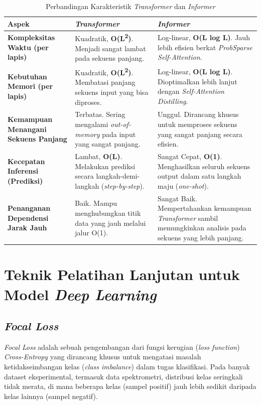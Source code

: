 \begin{table}[H]
\centering
\caption{Perbandingan Karakteristik \textit{Transformer} dan \textit{Informer}}
\label{tab:transformer_vs_informer}
\begin{tabularx}{\textwidth}{>{\raggedright\arraybackslash}X >{\raggedright\arraybackslash}X >{\raggedright\arraybackslash}X}
\toprule
\textbf{Aspek} & \textbf{\textit{Transformer}} & \textbf{\textit{Informer}} \\
\midrule
\textbf{Kompleksitas Waktu (per lapis)} & Kuadratik, \textbf{O(L\textsuperscript{2})}. Menjadi sangat lambat pada sekuens panjang. & Log-linear, \textbf{O(L log L)}. Jauh lebih efisien berkat \textit{ProbSparse Self-Attention}. \\
\addlinespace
\textbf{Kebutuhan Memori (per lapis)} & Kuadratik, \textbf{O(L\textsuperscript{2})}. Membatasi panjang sekuens input yang bisa diproses. & Log-linear, \textbf{O(L log L)}. Dioptimalkan lebih lanjut dengan \textit{Self-Attention Distilling}. \\
\addlinespace
\textbf{Kemampuan Menangani Sekuens Panjang} & Terbatas. Sering mengalami \textit{out-of-memory} pada input yang sangat panjang. & Unggul. Dirancang khusus untuk memproses sekuens yang sangat panjang secara efisien. \\
\addlinespace
\textbf{Kecepatan Inferensi (Prediksi)} & Lambat, \textbf{O(L)}. Melakukan prediksi secara langkah-demi-langkah (\textit{step-by-step}). & Sangat Cepat, \textbf{O(1)}. Menghasilkan seluruh sekuens output dalam satu langkah maju (\textit{one-shot}). \\
\addlinespace
\textbf{Penanganan Dependensi Jarak Jauh} & Baik. Mampu menghubungkan titik data yang jauh melalui jalur O(1). & Sangat Baik. Mempertahankan kemampuan \textit{Transformer} sambil memungkinkan analisis pada sekuens yang lebih panjang. \\
\bottomrule
\end{tabularx}
\end{table}

\section{Teknik Pelatihan Lanjutan untuk Model \textit{Deep Learning}}

\subsection{\textit{Focal Loss}}

\textit{Focal Loss} adalah sebuah pengembangan dari fungsi kerugian (\textit{loss function}) \textit{Cross-Entropy} yang dirancang khusus untuk mengatasi masalah ketidakseimbangan kelas (\textit{class imbalance}) dalam tugas klasifikasi. Pada banyak dataset eksperimental, termasuk data spektrometri, distribusi kelas seringkali tidak merata, di mana beberapa kelas (sampel positif) jauh lebih sedikit daripada kelas lainnya (sampel negatif).

